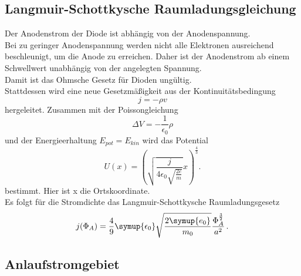 \subsection{Langmuir-Schottkysche Raumladungsgleichung}
Der Anodenstrom der Diode ist abhängig von der Anodenspannung.\\
Bei zu geringer Anodenspannung werden nicht alle Elektronen ausreichend beschleunigt, um die Anode zu erreichen. 
Daher ist der Anodenstrom ab einem Schwellwert unabhängig von der angelegten Spannung.\\
Damit ist das Ohmsche Gesetz für Dioden ungültig. \\
Stattdessen wird eine neue Gesetzmäßigkeit aus der Kontinuitätsbedingung 
\begin{equation*}
j = - \rho v
\end{equation*}
hergeleitet. 
Zusammen mit der Poissongleichung 
\begin{equation*}
\Delta V = - \frac{1}{\epsilon_0} \rho
\label{eq:poisson}
\end{equation*}
und der Energieerhaltung $E_{pot}=E_{kin}$ wird das Potential 
\begin{equation*}
  U(x) = \left(\sqrt{\frac{j}{4\epsilon_0\sqrt{\frac{2e}{m}}}}x\right)^{\frac{4}{3}}.
  \end{equation*}
bestimmt. Hier ist x die Ortskoordinate.\\ 
Es folgt für die Stromdichte das Langmuir-Schottkysche Raumladungsgesetz 
\begin{equation}
  j (\Phi_A)= \frac{4}{9} \symup{\epsilon_0} \sqrt{\frac{2\symup{e_{0}}}{m_{0}}} \frac{\Phi_A^{\frac{3}{2}}}{a^2} \,.
  \label{eq:lang}
\end{equation}



\subsection{Anlaufstromgebiet}

